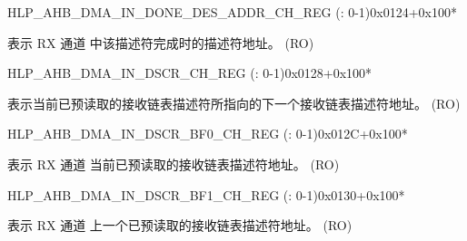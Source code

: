 \begin{register}{H}{LP\_AHB\_DMA\_IN\_DONE\_DES\_ADDR\_CH\_REG (: 0-1)}{0x0124+0x100*}\label{regdesc:LPAHBDMAINDONEDESADDRCHNREG}
%
\regnewline%
\begin{regdesc}\begin{reglist}
\label{fielddesc:LPAHBDMAINDONEDESADDRCHN}\item [LP\_AHB\_DMA\_IN\_DONE\_DES\_ADDR\_CH\regindex{n}] 表示 RX 通道  中该描述符完成时的描述符地址。 (RO)
\end{reglist}\end{regdesc}
\end{register}


\begin{register}{H}{LP\_AHB\_DMA\_IN\_DSCR\_CH\_REG (: 0-1)}{0x0128+0x100*}\label{regdesc:LPAHBDMAINDSCRCHNREG}
%
\regnewline%
\begin{regdesc}\begin{reglist}
\label{fielddesc:LPAHBDMAINLINKDSCRCHN}\item [LP\_AHB\_DMA\_INLINK\_DSCR\_CH\regindex{n}] 表示当前已预读取的接收链表描述符所指向的下一个接收链表描述符地址。 (RO)
\end{reglist}\end{regdesc}
\end{register}


\begin{register}{H}{LP\_AHB\_DMA\_IN\_DSCR\_BF0\_CH\_REG (: 0-1)}{0x012C+0x100*}\label{regdesc:LPAHBDMAINDSCRBF0CHNREG}
%
\regnewline%
\begin{regdesc}\begin{reglist}
\label{fielddesc:LPAHBDMAINLINKDSCRBF0CHN}\item [LP\_AHB\_DMA\_INLINK\_DSCR\_BF0\_CH\regindex{n}] 表示 RX 通道  当前已预读取的接收链表描述符地址。 (RO)
\end{reglist}\end{regdesc}
\end{register}


\begin{register}{H}{LP\_AHB\_DMA\_IN\_DSCR\_BF1\_CH\_REG (: 0-1)}{0x0130+0x100*}\label{regdesc:LPAHBDMAINDSCRBF1CHNREG}
%
\regnewline%
\begin{regdesc}\begin{reglist}
\label{fielddesc:LPAHBDMAINLINKDSCRBF1CHN}\item [LP\_AHB\_DMA\_INLINK\_DSCR\_BF1\_CH\regindex{n}] 表示 RX 通道  上一个已预读取的接收链表描述符地址。 (RO)
\end{reglist}\end{regdesc}
\end{register}


